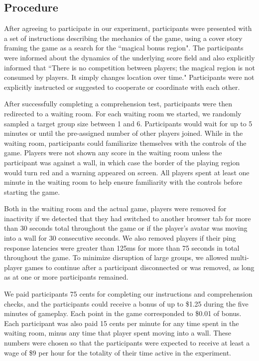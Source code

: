 \documentclass[12pt,letterpaper]{article}
\begin{document}
\subsection{Procedure}

After agreeing to participate in our experiment, participants were presented with a set of instructions describing the mechanics of the game, using a cover story framing the game as a search for the ``magical bonus region".  
The participants were informed about the dynamics of the underlying score field and also explicitly informed that ``There is no competition between players; the magical region is not consumed by players. It simply changes location over time." 
Participants were not explicitly instructed or suggested to cooperate or coordinate with each other.

After successfully completing a comprehension test, participants were then redirected to a waiting room.
For each waiting room we started, we randomly sampled a target group size between 1 and 6.
Participants would wait for up to 5 minutes or until the pre-assigned number of other players joined.
While in the waiting room, participants could familiarize themselves with the controls of the game.  Players were not shown any score in
the waiting room unless the participant was against a wall, in which
case the border of the playing region would turn red and a warning appeared on screen.  All players spent at least one minute in the waiting room to help ensure familiarity with the controls before starting the game. 

Both in the waiting room and the actual game, players were removed for inactivity if we detected that they had switched to another browser tab for more than 30 seconds total throughout the game or if the player's avatar was moving into a wall for 30 consecutive seconds.  
We also removed players if their ping response latencies were greater than 125ms for more than 75 seconds in total throughout the game.  
To minimize disruption of large groups, we allowed multi-player games to continue after a participant disconnected or was removed, as long as at one or more participants remained.

We paid participants 75 cents for completing our instructions and comprehension checks, and the participants could receive a bonus of up to \$1.25 during the five minutes of gameplay. Each point in the game corresponded to \$0.01 of bonus. Each participant was also paid 15 cents per minute for any time spent in the waiting room, minus any time that player spent moving into a wall.  These numbers were chosen so that the participants were expected to receive at least a wage of \$9 per hour for the totality of their time active in the
experiment.
\end{document}
